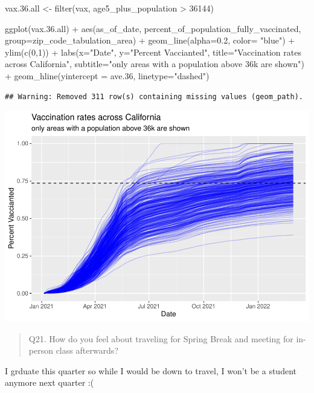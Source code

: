 \documentclass[
]{article}
\newenvironment{Shaded}{\begin{snugshade}}{\end{snugshade}}
\newcommand{\AttributeTok}[1]{\textcolor[rgb]{0.77,0.63,0.00}{#1}}
\newcommand{\DecValTok}[1]{\textcolor[rgb]{0.00,0.00,0.81}{#1}}
\newcommand{\FloatTok}[1]{\textcolor[rgb]{0.00,0.00,0.81}{#1}}
\newcommand{\FunctionTok}[1]{\textcolor[rgb]{0.00,0.00,0.00}{#1}}
\newcommand{\NormalTok}[1]{#1}
\newcommand{\OtherTok}[1]{\textcolor[rgb]{0.56,0.35,0.01}{#1}}
\newcommand{\SpecialCharTok}[1]{\textcolor[rgb]{0.00,0.00,0.00}{#1}}
\newcommand{\StringTok}[1]{\textcolor[rgb]{0.31,0.60,0.02}{#1}}
\begin{document}
\begin{Shaded}
\begin{Highlighting}[]
\NormalTok{vax.}\FloatTok{36.}\NormalTok{all }\OtherTok{\textless{}{-}} \FunctionTok{filter}\NormalTok{(vax, age5\_plus\_population }\SpecialCharTok{\textgreater{}} \DecValTok{36144}\NormalTok{)}

\FunctionTok{ggplot}\NormalTok{(vax.}\FloatTok{36.}\NormalTok{all) }\SpecialCharTok{+}
  \FunctionTok{aes}\NormalTok{(as\_of\_date,}
\NormalTok{      percent\_of\_population\_fully\_vaccinated, }
      \AttributeTok{group=}\NormalTok{zip\_code\_tabulation\_area) }\SpecialCharTok{+}
  \FunctionTok{geom\_line}\NormalTok{(}\AttributeTok{alpha=}\FloatTok{0.2}\NormalTok{, }\AttributeTok{color=} \StringTok{"blue"}\NormalTok{) }\SpecialCharTok{+}
  \FunctionTok{ylim}\NormalTok{(}\FunctionTok{c}\NormalTok{(}\DecValTok{0}\NormalTok{,}\DecValTok{1}\NormalTok{)) }\SpecialCharTok{+}
  \FunctionTok{labs}\NormalTok{(}\AttributeTok{x=}\StringTok{"Date"}\NormalTok{, }\AttributeTok{y=}\StringTok{"Percent Vaccianted"}\NormalTok{,}
       \AttributeTok{title=}\StringTok{"Vaccination rates across California"}\NormalTok{,}
       \AttributeTok{subtitle=}\StringTok{"only areas with a population above 36k are shown"}\NormalTok{) }\SpecialCharTok{+}
  \FunctionTok{geom\_hline}\NormalTok{(}\AttributeTok{yintercept =}\NormalTok{ ave}\FloatTok{.36}\NormalTok{, }\AttributeTok{linetype=}\StringTok{"dashed"}\NormalTok{)}
\end{Highlighting}
\end{Shaded}

\begin{verbatim}
## Warning: Removed 311 row(s) containing missing values (geom_path).
\end{verbatim}

\includegraphics{COVID19-Vax-mini-project_files/figure-latex/unnamed-chunk-37-1.pdf}

\begin{quote}
Q21. How do you feel about traveling for Spring Break and meeting for
in-person class afterwards?
\end{quote}

I grduate this quarter so while I would be down to travel, I won't be a
student anymore next quarter :(
\end{document}

